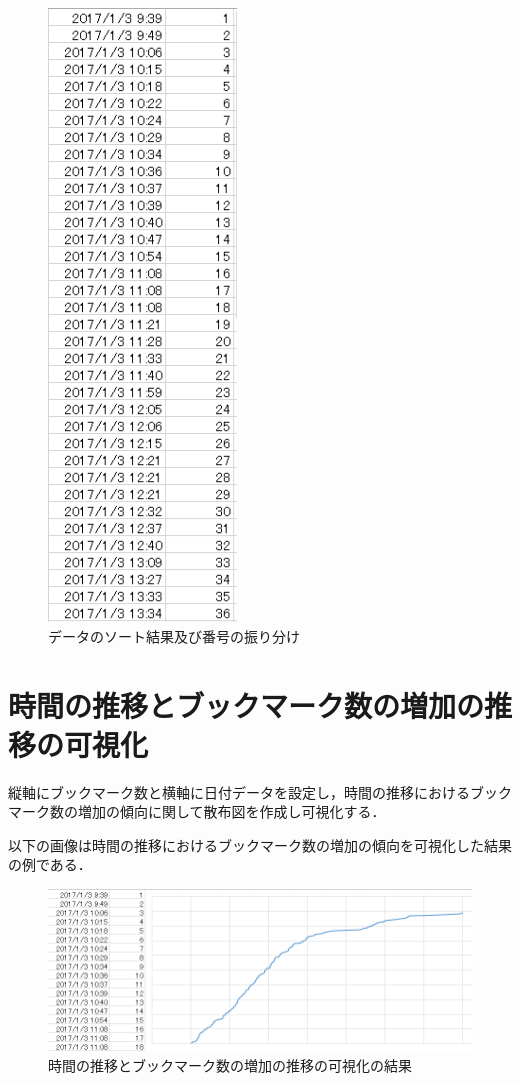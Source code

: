 \begin{figure}[htb]
\centering
\includegraphics[width=5cm]{excel3.PNG}
\caption{データのソート結果及び番号の振り分け}\label{excel3}
\end{figure}

\newpage

\section{時間の推移とブックマーク数の増加の推移の可視化}
縦軸にブックマーク数と横軸に日付データを設定し，時間の推移におけるブックマーク数の増加の傾向に関して散布図を作成し可視化する．\par
以下の画像は時間の推移におけるブックマーク数の増加の傾向を可視化した結果の例である．

\begin{figure}[htb]
\centering
\includegraphics[width=13cm]{excel4.PNG}
\caption{時間の推移とブックマーク数の増加の推移の可視化の結果}\label{excel4}
\end{figure}

